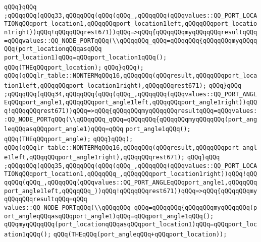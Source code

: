 \verb|qQQq}qQQq|\newline
\verb|;qQQqqQQq(qQQq33,qQQqqQQq(qQQq(qQQq_,qQQqqQQq(qQQqvalues::QQ_PORT_LOCATIONqQQqport_location1,qQQqqQQqport_location1left,qQQqqQQqport_location1right))qQQq!qQQqqQQqrest671))qQQq=>qQQq{qQQqqQQqmyqQQqqQQqresultqQQq=qQQqvalues::QQ_NODE_PORTqQQq(\\qQQqqQQq_qQQq=qQQqqQQq{qQQqqQQqmyqQQqqQQq(port_locationqQQqasqQQq|\newline
\verb|port_location1)qQQq=qQQqport_location1qQQq();|\newline
\verb|qQQq(THEqQQqport_location);|\newline
\verb|qQQq}qQQq);|\newline
\verb|qQQq(qQQqlr_table::NONTERMqQQq16,qQQqqQQq(qQQqresult,qQQqqQQqport_location1left,qQQqqQQqport_location1right),qQQqqQQqrest671);|\newline
\verb|qQQq}qQQq|\newline
\verb|;qQQqqQQq(qQQq34,qQQqqQQq(qQQq(qQQq_,qQQqqQQq(qQQqvalues::QQ_PORT_ANGLEqQQqport_angle1,qQQqqQQqport_angle1left,qQQqqQQqport_angle1right))qQQq!qQQqqQQqrest671))qQQq=>qQQq{qQQqqQQqmyqQQqqQQqresultqQQq=qQQqvalues::QQ_NODE_PORTqQQq(\\qQQqqQQq_qQQq=qQQqqQQq{qQQqqQQqmyqQQqqQQq(port_angleqQQqasqQQqport_angle1)qQQq=qQQq|\newline
\verb|port_angle1qQQq();|\newline
\verb|qQQq(THEqQQqport_angle);|\newline
\verb|qQQq}qQQq);|\newline
\verb|qQQq(qQQqlr_table::NONTERMqQQq16,qQQqqQQq(qQQqresult,qQQqqQQqport_angle1left,qQQqqQQqport_angle1right),qQQqqQQqrest671);|\newline
\verb|qQQq}qQQq|\newline
\verb|;qQQqqQQq(qQQq35,qQQqqQQq(qQQq(qQQq_,qQQqqQQq(qQQqvalues::QQ_PORT_LOCATIONqQQqport_location1,qQQqqQQq_,qQQqqQQqport_location1right))qQQq!qQQqqQQq(qQQq_,qQQqqQQq(qQQqvalues::QQ_PORT_ANGLEqQQqport_angle1,qQQqqQQqport_angle1left,qQQqqQQq_))qQQq!qQQqqQQqrest671))qQQq=>qQQq{qQQqqQQqmyqQQqqQQqresultqQQq=qQQq|\newline
\verb|values::QQ_NODE_PORTqQQq(\\qQQqqQQq_qQQq=qQQqqQQq{qQQqqQQqmyqQQqqQQq(port_angleqQQqasqQQqport_angle1)qQQq=qQQqport_angle1qQQq();|\newline
\verb|qQQqmyqQQqqQQq(port_locationqQQqasqQQqport_location1)qQQq=qQQqport_location1qQQq();|\newline
\verb|qQQq(THEqQQq(port_angleqQQq+qQQqport_location));|\newline
